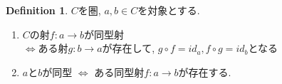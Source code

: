 \documentclass[a4paper,10pt]{article}
\theoremstyle{definition}
\newtheorem{definition}[thm]{\bfseries Definition}
\begin{document}
\begin{definition}
    $C$を圏, $a,b \in C$を対象とする.
    \begin{enumerate}[(1)]
        \item $C$の射$f:a \rightarrow b$が同型射\\
        $\Leftrightarrow$ある射$g:b \rightarrow a$が存在して, $g \circ f = id_a, f \circ g = id_b$となる
        \item $a$と$b$が同型 $\Leftrightarrow$ ある同型射$f:a \rightarrow b$が存在する.
    \end{enumerate}
\end{definition}
\end{document}
